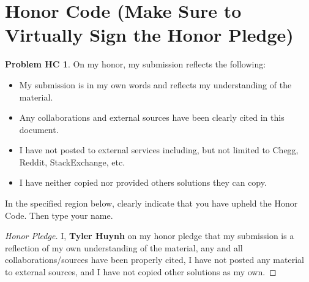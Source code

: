 \documentclass[11pt]{article}
\theoremstyle{definition}
\theoremstyle{definition}
\newtheorem*{requiredHC}{Problem HC}
\theoremstyle{definition}
\begin{document}
\section*{Honor Code (Make Sure to Virtually Sign the Honor Pledge)} 
\hypertarget{HonorCode}{}

\begin{requiredHC}
On my honor, my submission reflects the following:
\begin{itemize}
\item My submission is in my own words and reflects my understanding of the material.
\item Any collaborations and external sources have been clearly cited in this document.
\item I have not posted to external services including, but not limited to Chegg, Reddit, StackExchange, etc.
\item I have neither copied nor provided others solutions they can copy.
\end{itemize}

\noindent In the specified region below, clearly indicate that you have upheld the Honor Code. Then type your name. 
\end{requiredHC}

\begin{proof}[Honor Pledge]
I, \textbf{Tyler Huynh} on my honor pledge that my submission is a reflection of my own understanding of the material, any and all collaborations/sources have been properly cited, I have not posted any material to external sources, and I have not copied other solutions as my own.
\end{proof}


\newpage

\setcounter{section}{11}
\setcounter{required}{11}
\end{document}
